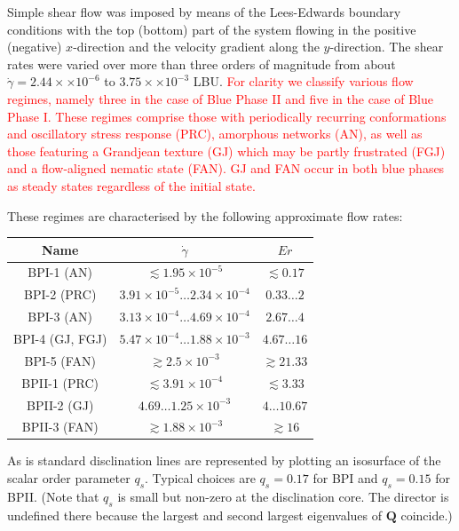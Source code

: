 \documentclass[8.5pt,twoside,twocolumn]{article}
\newcommand{\e}[1]{\times10^{#1}}
\newcommand{\gd}{\dot{\gamma}}
\newcommand{\rev}[1]{{\textcolor{red}{#1}}}
\begin{document}
Simple shear flow was imposed by means of the Lees-Edwards boundary
conditions with
the top (bottom) part of the system flowing in the positive (negative) $x$-direction and the 
velocity gradient along the $y$-direction.
The shear rates were varied over more than three orders of magnitude from about 
$\gd=2.44\times \e{-6}$ to $3.75\times\e{-3}$ LBU.
\rev{
For clarity we classify various flow regimes, namely three in the case of Blue Phase II and five in the 
case of Blue Phase I. These regimes comprise those with periodically recurring conformations and oscillatory stress response (PRC), 
amorphous networks (AN), as well as those featuring a Grandjean texture (GJ) which 
may be partly frustrated (FGJ) and a flow-aligned nematic state (FAN). 
GJ and FAN occur in both blue phases as steady states regardless of the initial state.
}

These regimes are characterised by the following approximate flow rates: 

\begin{table}[htpb]
\begin{tabular}{|c|c|c|}
\hline
Name & $\gd$ & $Er$ \\
\hline
BPI-1 (AN) & $ \lesssim 1.95\e{-5}$ & $\lesssim 0.17$ \\
BPI-2 (PRC) & $3.91\e{-5} \dots 2.34\e{-4}$ & $0.33 \dots 2$ \\
BPI-3 (AN) & $3.13\e{-4}\dots 4.69\e{-4}$ & $2.67 \dots 4$ \\
BPI-4 (GJ, FGJ) & $5.47\e{-4} \dots 1.88\e{-3}$ & $4.67 \dots 16$ \\
BPI-5 (FAN) & $\gtrsim 2.5\e{-3}$ & $ \gtrsim 21.33$ \\
\hline
BPII-1 (PRC) & $\lesssim 3.91\e{-4}$ & $ \lesssim 3.33$\\
BPII-2 (GJ) & $4.69\dots 1.25\e{-3}$ & $4 \dots 10.67$ \\
BPII-3 (FAN) &$\gtrsim 1.88\e{-3}$ & $ \gtrsim 16$ \\ 
\hline
\end{tabular}
\label{table2}
\end{table}

As is standard \cite{Henrich:2010b,Henrich:2012b} disclination lines are represented by plotting an isosurface of the scalar order parameter $q_s$. 
Typical choices are $q_s=0.17$ for BPI and $q_s=0.15$ for BPII.
(Note that $q_s$ is small but non-zero at the disclination core. 
The director is undefined there because the largest and second largest eigenvalues of ${\mathbf Q}$ coincide.)
\end{document}

